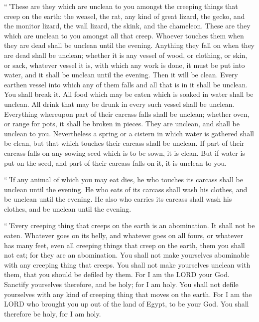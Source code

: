  ``\,'These are they which are unclean to you amongst the
creeping things that creep on the earth: the weasel, the rat, any kind
of great lizard,  the gecko, and the monitor lizard, the
wall lizard, the skink, and the chameleon.  These are
they which are unclean to you amongst all that creep. Whoever touches
them when they are dead shall be unclean until the evening.
 Anything they fall on when they are dead shall be
unclean; whether it is any vessel of wood, or clothing, or skin, or
sack, whatever vessel it is, with which any work is done, it must be put
into water, and it shall be unclean until the evening. Then it will be
clean.  Every earthen vessel into which any of them falls
and all that is in it shall be unclean. You shall break it.
 All food which may be eaten which is soaked in water
shall be unclean. All drink that may be drunk in every such vessel shall
be unclean.  Everything whereupon part of their carcass
falls shall be unclean; whether oven, or range for pots, it shall be
broken in pieces. They are unclean, and shall be unclean to you.
 Nevertheless a spring or a cistern in which water is
gathered shall be clean, but that which touches their carcass shall be
unclean.  If part of their carcass falls on any sowing
seed which is to be sown, it is clean.  But if water is
put on the seed, and part of their carcass falls on it, it is unclean to
you.

 ``\,'If any animal of which you may eat dies, he who
touches its carcass shall be unclean until the evening. 
He who eats of its carcass shall wash his clothes, and be unclean until
the evening. He also who carries its carcass shall wash his clothes, and
be unclean until the evening.

 ``\,'Every creeping thing that creeps on the earth is an
abomination. It shall not be eaten.  Whatever goes on its
belly, and whatever goes on all fours, or whatever has many feet, even
all creeping things that creep on the earth, them you shall not eat; for
they are an abomination.  You shall not make yourselves
abominable with any creeping thing that creeps. You shall not make
yourselves unclean with them, that you should be defiled by them.
 For I am the LORD your God. Sanctify yourselves
therefore, and be holy; for I am holy. You shall not defile yourselves
with any kind of creeping thing that moves on the earth. 
For I am the LORD who brought you up out of the land of Egypt, to be
your God. You shall therefore be holy, for I am holy.

